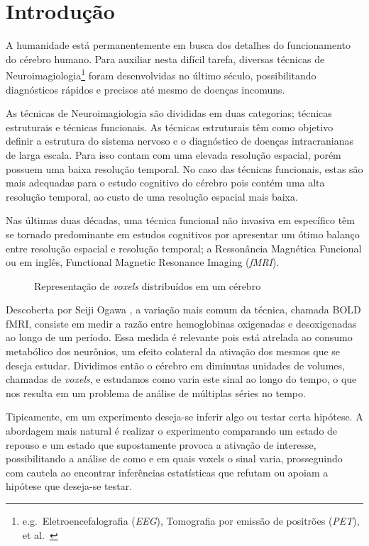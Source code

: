 \documentclass[11pt,a4paper]{report}
\begin{document}

\titleGP
\newpage
\section*{Introdução}
A humanidade está permanentemente em busca dos detalhes do funcionamento do cérebro humano. Para auxiliar nesta difícil tarefa, diversas técnicas de Neuroimagiologia\footnote{e.g.\ Eletroencefalografia (\emph{EEG}), Tomografia por emissão de positrões (\emph{PET}), et al.\ } foram desenvolvidas no último século, possibilitando diagnósticos rápidos e precisos até mesmo de doenças incomuns.

As técnicas de Neuroimagiologia são divididas em duas categorias; técnicas estruturais e técnicas funcionais. As técnicas estruturais têm como objetivo definir a estrutura do sistema nervoso e o diagnóstico de doenças intracranianas de larga escala. Para isso contam com uma elevada resolução espacial, porém possuem uma baixa resolução temporal. No caso das técnicas funcionais, estas são mais adequadas para o estudo cognitivo do cérebro pois contém uma alta resolução temporal, ao custo de uma resolução espacial mais baixa.


Nas últimas duas décadas, uma técnica funcional não invasiva em específico têm se tornado predominante em estudos cognitivos por apresentar um ótimo balanço entre resolução espacial e resolução temporal; a Ressonância Magnética Funcional ou em inglês, Functional Magnetic Resonance Imaging (\emph{fMRI}). 
\begin{figure}[htpb]
  \centering
  
  \caption{Representação de \emph{voxels} distribuídos em um cérebro}
  \label{fig:1}
\end{figure}

Descoberta por Seiji Ogawa \cite{ogawa1990brain}, a variação mais comum da técnica, chamada BOLD fMRI, consiste em medir a razão entre hemoglobinas oxigenadas e desoxigenadas ao longo de um período. Essa medida é relevante pois está atrelada ao consumo metabólico dos neurônios, um efeito colateral da ativação dos mesmos que se deseja estudar. Dividimos então o cérebro em diminutas unidades de volumes, chamadas de \emph{voxels}, e estudamos como varia este sinal ao longo do tempo, o que nos resulta em um problema de análise de múltiplas séries no tempo.

Tipicamente, em um experimento deseja-se inferir algo ou testar certa hipótese. A abordagem mais natural é realizar o experimento comparando um estado de repouso e um estado que supostamente provoca a ativação de interesse, possibilitando a análise de como e em quais voxels o sinal varia, prosseguindo com cautela ao encontrar inferências estatísticas que refutam ou apoiam a hipótese que deseja-se testar.
\end{document}
